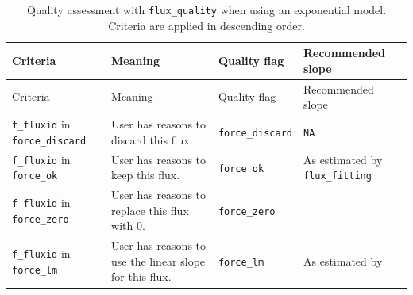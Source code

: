 \documentclass[
  letterpaper,
  DIV=11,
  numbers=noendperiod]{scrartcl}
\begin{document}
\begin{longtable}[]{@{}
  >{\raggedright\arraybackslash}p{}
  >{\raggedright\arraybackslash}p{}
  >{\raggedright\arraybackslash}p{}
  >{\raggedright\arraybackslash}p{}@{}}
\caption{\normalsize Quality assessment with \texttt{flux\_quality} when
using an exponential model. Criteria are applied in descending
order.}\label{tbl-flagsexp}\tabularnewline
\toprule\noalign{}
\begin{minipage}[b]{\linewidth}\raggedright
Criteria
\end{minipage} & \begin{minipage}[b]{\linewidth}\raggedright
Meaning
\end{minipage} & \begin{minipage}[b]{\linewidth}\raggedright
Quality flag
\end{minipage} & \begin{minipage}[b]{\linewidth}\raggedright
Recommended slope
\end{minipage} \\
\midrule\noalign{}
\endfirsthead
\toprule\noalign{}
\begin{minipage}[b]{\linewidth}\raggedright
Criteria
\end{minipage} & \begin{minipage}[b]{\linewidth}\raggedright
Meaning
\end{minipage} & \begin{minipage}[b]{\linewidth}\raggedright
Quality flag
\end{minipage} & \begin{minipage}[b]{\linewidth}\raggedright
Recommended slope
\end{minipage} \\
\midrule\noalign{}
\endhead
\bottomrule\noalign{}
\endlastfoot
\texttt{f\_fluxid} in \texttt{force\_discard} & User has reasons to
discard this flux. & \texttt{force\_discard} & \texttt{NA} \\
\texttt{f\_fluxid} in \texttt{force\_ok} & User has reasons to keep this
flux. & \texttt{force\_ok} & As estimated by \texttt{flux\_fitting} \\
\texttt{f\_fluxid} in \texttt{force\_zero} & User has reasons to replace
this flux with 0. & \texttt{force\_zero} & 0 \\
\texttt{f\_fluxid} in \texttt{force\_lm} & User has reasons to use the
linear slope for this flux. & \texttt{force\_lm} & As estimated by

\end{longtable}
\end{document}
